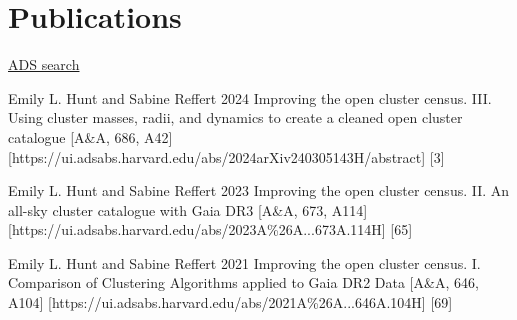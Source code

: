 \section*{Publications}

\href{\cvADSLink}{ADS search \faLink}%


\begin{etaremune}
    \item \publication
        {Emily L. Hunt and Sabine Reffert}
        {2024}
        {Improving the open cluster census. III. Using cluster masses, radii, and dynamics to create a cleaned open cluster catalogue}
        [A\&A, 686, A42]
        [https://ui.adsabs.harvard.edu/abs/2024arXiv240305143H/abstract]
        [3]
    \item \publication
        {Emily L. Hunt and Sabine Reffert}
        {2023}
        {Improving the open cluster census. II. An all-sky cluster catalogue with Gaia DR3}
        [A\&A, 673, A114]
        [https://ui.adsabs.harvard.edu/abs/2023A\%26A...673A.114H]
        [65]
    \item \publication
        {Emily L. Hunt and Sabine Reffert}
        {2021}
        {Improving the open cluster census. I. Comparison of Clustering Algorithms applied to Gaia DR2 Data}
        [A\&A, 646, A104]
        [https://ui.adsabs.harvard.edu/abs/2021A\%26A...646A.104H]
        [69]
\end{etaremune}

